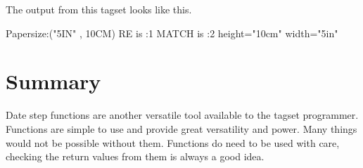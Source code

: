 The output from this tagset looks like this.

\begin{sfvoutput}
Papersize:("5IN" , 10CM)
RE is :1
MATCH is :2
 height="10cm"
 width="5in"
\end{sfvoutput}

\section{Summary}
Date step functions are another versatile tool available to the tagset programmer. 
Functions are simple to use and provide great versatility and power.  Many things 
would not be possible without them.  Functions do need to be used with care, checking
the return values from them is always a good idea.
